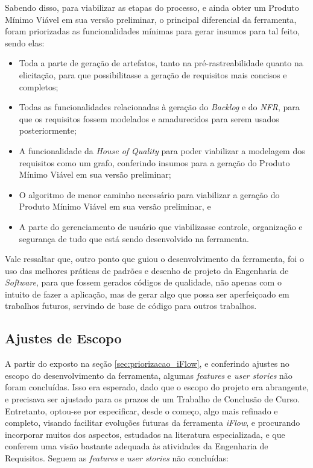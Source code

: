 Sabendo disso, para viabilizar as etapas do processo, e ainda obter um Produto Mínimo Viável em sua versão preliminar, o principal diferencial da ferramenta, foram priorizadas as funcionalidades mínimas para gerar insumos para tal feito, sendo elas:

\begin{itemize}
    \item Toda a parte de geração de artefatos, tanto na pré-rastreabilidade quanto na elicitação, para que possibilitasse a geração de requisitos mais concisos e completos;
    \item Todas as funcionalidades relacionadas à geração do \textit{Backlog} e do \textit{NFR}, para que os requisitos fossem modelados e amadurecidos para serem usados posteriormente;
    \item A funcionalidade da \textit{House of Quality} para poder viabilizar a modelagem dos requisitos como um grafo, conferindo insumos para a geração do Produto Mínimo Viável em sua versão preliminar;
    \item O algoritmo de menor caminho necessário para viabilizar a geração do Produto Mínimo Viável em sua versão preliminar, e
    \item A parte do gerenciamento de usuário que viabilizasse controle, organização e segurança de tudo que está sendo desenvolvido na ferramenta.
\end{itemize}

Vale ressaltar que, outro ponto que guiou o desenvolvimento da ferramenta, foi o uso das melhores práticas de padrões e desenho de projeto da Engenharia de \textit{Software}, para que fossem gerados códigos de qualidade, não apenas com o intuito de fazer a aplicação, mas de gerar algo que possa ser aperfeiçoado em trabalhos futuros, servindo de base de código para outros trabalhos.

\subsection{Ajustes de Escopo}
\label{sub:corte_de_escopo}

A partir do exposto na seção \ref{sec:priorizacao_iFlow}, e conferindo ajustes no escopo do desenvolvimento da ferramenta, algumas \textit{features} e \textit{user stories} não foram concluídas. Isso era esperado, dado que o escopo do projeto era abrangente, e precisava ser ajustado para os prazos de um Trabalho de Conclusão de Curso. Entretanto, optou-se por especificar, desde o começo, algo mais refinado e completo, visando facilitar evoluções futuras da ferramenta \textit{iFlow}, e procurando incorporar muitos dos aspectos, estudados na literatura especializada, e que conferem uma visão bastante adequada às atividades da Engenharia de Requisitos. Seguem as \textit{features} e \textit{user stories} não concluídas:

